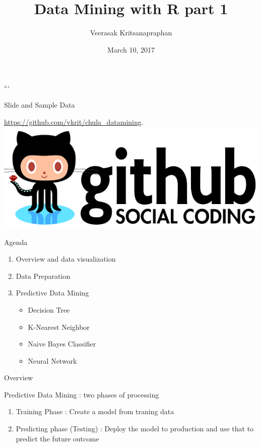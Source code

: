 \documentclass[ignorenonframetext,]{beamer}
\title{Data Mining with R part 1}
\author{Veerasak Kritsanapraphan}
\date{March 10, 2017}
\providecommand{\tightlist}{%
\setlength{\itemsep}{0pt}\setlength{\parskip}{0pt}}
\begin{document}
\frame{\titlepage}

\begin{frame}

```

\end{frame}

\begin{frame}{Slide and Sample Data}

\url{https://github.com/vkrit/chula_datamining}.
\includegraphics{github-logo.png}

\end{frame}

\begin{frame}{Agenda}

\begin{enumerate}
\def\labelenumi{\arabic{enumi}.}
\tightlist
\item
  Overview and data visualization
\item
  Data Preparation
\item
  Predictive Data Mining

  \begin{itemize}
  \tightlist
  \item
    Decision Tree
  \item
    K-Nearest Neighbor
  \item
    Naive Bayes Classifier
  \item
    Neural Network
  \end{itemize}
\end{enumerate}

\end{frame}

\begin{frame}{Overview}

Predictive Data Mining : two phases of processing

\begin{enumerate}
\def\labelenumi{\arabic{enumi}.}
\tightlist
\item
  Training Phase : Create a model from traning data
\item
  Predicting phase (Testing) : Deploy the model to production and use
  that to predict the future outcome
\end{enumerate}

\end{frame}
\end{document}

